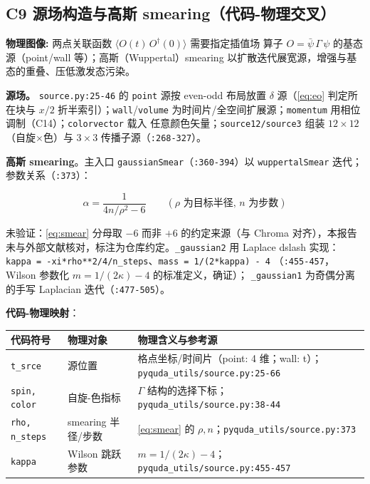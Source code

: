 \documentclass[UTF8]{ctexart}
\begin{document}
\subsection{C9 源场构造与高斯 smearing（代码-物理交叉）}

\begin{physbox}
\textbf{物理图像:} 两点关联函数 $\langle O(t)\,O^\dagger(0)\rangle$ 需要指定插值场
算子 $O = \bar\psi\,\Gamma\,\psi$ 的基态源（point/wall 等）；高斯（Wuppertal）smearing
以扩散迭代展宽源，增强与基态的重叠、压低激发态污染。
\end{physbox}

\textbf{源场。} \texttt{source.py:25-46} 的 \texttt{point} 源按 even-odd 布局放置
$\delta$ 源（\eqref{eq:eo} 判定所在块与 $x/2$ 折半索引）；\texttt{wall}/\texttt{volume}
为时间片/全空间扩展源；\texttt{momentum} 用相位调制（C14）；\texttt{colorvector} 载入
任意颜色矢量；\texttt{source12/source3} 组装 $12\times12$（自旋$\times$色）与
$3\times3$ 传播子源（\texttt{:268-327}）。

\textbf{高斯 smearing}。主入口 \texttt{gaussianSmear}（\texttt{:360-394}）以
\texttt{wuppertalSmear} 迭代；参数关系（\texttt{:373}）：

\begin{equation}\label{eq:smear}
\alpha = \frac{1}{4n/\rho^2 - 6}
\qquad(\rho \text{ 为目标半径, } n \text{ 为步数})
\end{equation}

\textcolor{warn}{未验证}：\eqref{eq:smear} 分母取 $-6$ 而非 $+6$ 的约定来源（与 Chroma
对齐），本报告未与外部文献核对，标注为仓库约定。\texttt{\_gaussian2} 用 Laplace dslash
实现：\texttt{kappa = -xi*rho**2/4/n\_steps}、\texttt{mass = 1/(2*kappa) - 4}
（\texttt{:455-457}，Wilson 参数化 $m = 1/(2\kappa) - 4$ 的标准定义，\textcolor{accent}{确证}）；
\texttt{\_gaussian1} 为奇偶分离的手写 Laplacian 迭代（\texttt{:477-505}）。

\textbf{代码-物理映射}：

\begin{xltabular}{\textwidth}{llX}
\toprule
\textcolor{map}{代码符号} & 物理对象 & 物理含义与参考源 \\
\midrule
\endhead
\texttt{t\_srce} & 源位置 & 格点坐标/时间片（point: 4 维；wall: t）；\texttt{\nolinkurl{pyquda_utils/source.py:25-66}} \\
\texttt{spin, color} & 自旋-色指标 & $\Gamma$ 结构的选择下标；\texttt{\nolinkurl{pyquda_utils/source.py:38-44}} \\
\texttt{rho, n\_steps} & smearing 半径/步数 & \eqref{eq:smear} 的 $\rho,n$；\texttt{\nolinkurl{pyquda_utils/source.py:373}} \\
\texttt{kappa} & Wilson 跳跃参数 & $m = 1/(2\kappa) - 4$；\texttt{\nolinkurl{pyquda_utils/source.py:455-457}} \\
\bottomrule
\end{xltabular}
\end{document}
